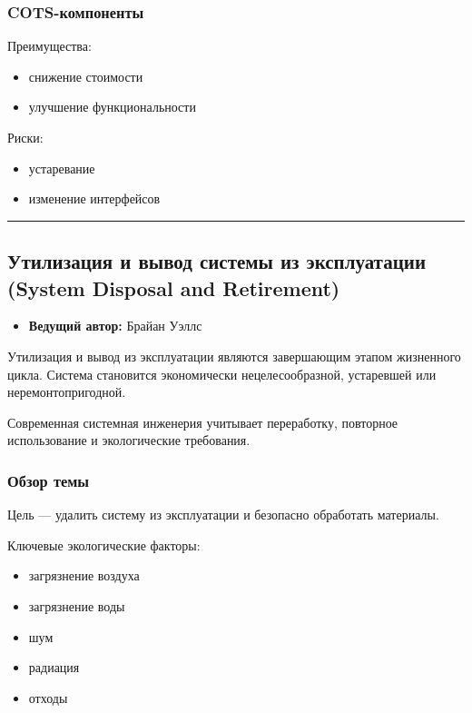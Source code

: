 \documentclass[14pt,a4paper]{extarticle}
\begin{document}
\subsubsection{COTS-компоненты}

Преимущества:

\begin{itemize}
\item снижение стоимости
\item улучшение функциональности
\end{itemize}

Риски:

\begin{itemize}
\item устаревание
\item изменение интерфейсов
\end{itemize}

\hrule

\subsection{Утилизация и вывод системы из эксплуатации (System Disposal and Retirement)}

\begin{itemize}
\item \textbf{Ведущий автор:} Брайан Уэллс
\end{itemize}

Утилизация и вывод из эксплуатации являются завершающим этапом жизненного цикла. Система становится экономически нецелесообразной, устаревшей или неремонтопригодной.

Современная системная инженерия учитывает переработку, повторное использование и экологические требования.

\subsubsection{Обзор темы}

Цель — удалить систему из эксплуатации и безопасно обработать материалы.

Ключевые экологические факторы:

\begin{itemize}
\item загрязнение воздуха
\item загрязнение воды
\item шум
\item радиация
\item отходы
\end{itemize}
\end{document}

